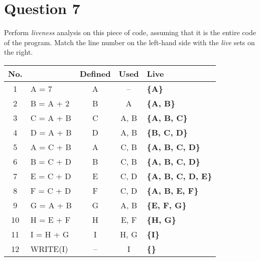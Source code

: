 \documentclass{article}
\begin{document}
\section*{Question 7}
Perform \textit{liveness} analysis on this piece of code, assuming that it is the entire code of the program. Match the line number on the left-hand side with the \textit{live} sets on the right. \\
\begin{tabular}{|c|l|c|c|>{\bfseries}l|}
  \hline
  \textbf{No.} &  & \textbf{Defined} & \textbf{Used} & \textbf{Live} \\
  \hline
  1   & A = 7      & A  & --    & \{A\} \\
  \hline
  2   & B = A + 2  & B  & A     & \{A, B\} \\
  \hline
  3   & C = A + B  & C  & A, B  & \{A, B, C\} \\
  \hline
  4   & D = A + B  & D  & A, B  & \{B, C, D\} \\
  \hline
  5   & A = C + B  & A  & C, B  & \{A, B, C, D\} \\
  \hline
  6   & B = C + D  & B  & C, B  & \{A, B, C, D\} \\
  \hline
  7   & E = C + D  & E  & C, D  & \{A, B, C, D, E\} \\
  \hline
  8   & F = C + D  & F  & C, D  & \{A, B, E, F\} \\
  \hline
  9   & G = A + B  & G  & A, B  & \{E, F, G\} \\
  \hline
  10  & H = E + F  & H  & E, F  & \{H, G\} \\
  \hline
  11  & I = H + G  & I  & H, G  & \{I\} \\
  \hline
  12  & WRITE(I)   & -- & I     & \{\} \\
  \hline
\end{tabular}


\newpage
\end{document}
